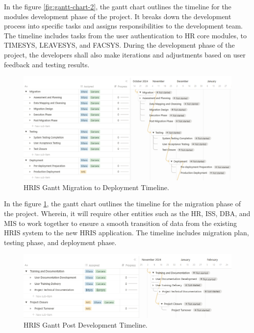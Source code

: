     In the figure \ref{fig:gantt-chart-2}, the gantt chart outlines the timeline for the modules development phase of the project. It breaks down the development process into specific tasks and assigns responsibilities to the development team. The timeline includes tasks from the user authentication to HR core modules, to TIMESYS, LEAVESYS, and FACSYS. During the development phase of the project, the developers shall also make iterations and adjustments based on user feedback and testing results.

    \begin{figure}[H]
        \centering
        \includegraphics[width=1\linewidth]{figures/images/gantt-chart-3.png}
        \caption{HRIS Gantt Migration to Deployment Timeline.}
        \label{fig:gantt-chart-3}
    \end{figure}

    In the figure \ref{fig:gantt-chart-3}, the gantt chart outlines the timeline for the migration phase of the project. Wherein, it will require other entities such as the HR, ISS, DBA, and MIS to work together to ensure a smooth transition of data from the existing HRIS system to the new HRIS application. The timeline includes migration plan, testing phase, and deployment phase.

    \begin{figure}[H]
        \centering
        \includegraphics[width=1\linewidth]{figures/images/gantt-chart-4.png}
        \caption{HRIS Gantt Post Development Timeline.}
        \label{fig:gantt-chart-4}
    \end{figure}


